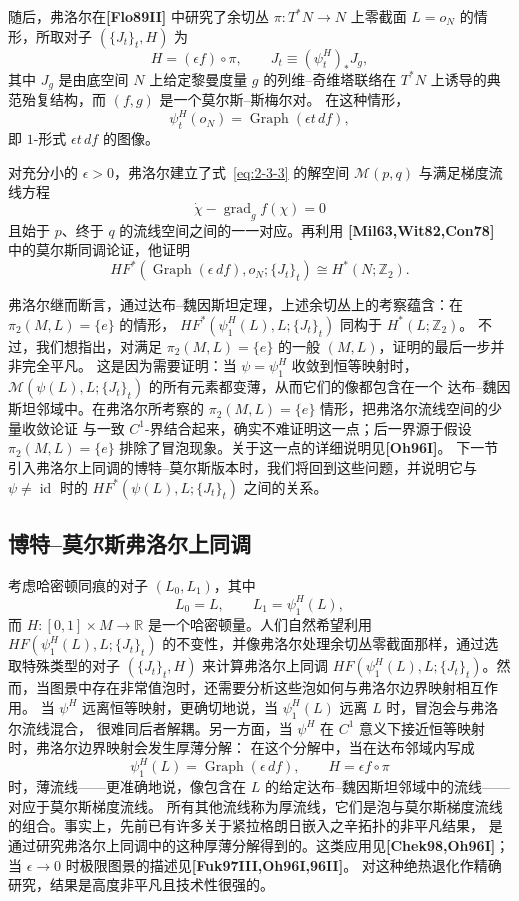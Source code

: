 随后，弗洛尔在\textbf{[Flo89II]} 中研究了余切丛
$\pi:T^*N\to N$ 上零截面 $L=o_N$ 的情形，所取对子
$(\{J_t\}_t,H)$ 为
\[
  H=(\epsilon f)\circ\pi,
  \qquad
  J_t\equiv(\psi_t^H)_*J_g,
\]
其中 $J_g$ 是由底空间 $N$ 上给定黎曼度量 $g$ 的列维--奇维塔联络在
$T^*N$ 上诱导的典范殆复结构，而 $(f,g)$ 是一个莫尔斯--斯梅尔对。
在这种情形，
\[
  \psi_t^H(o_N)=\operatorname{Graph}(\epsilon t\,df),
\]
即 $1$-形式 $\epsilon t\,df$ 的图像。

对充分小的 $\epsilon>0$，弗洛尔建立了式~\eqref{eq:2-3-3} 的解空间
$\mathcal M(p,q)$ 与满足梯度流线方程
\[
  \dot\chi-\operatorname{grad}_g f(\chi)=0
\]
且始于 $p$、终于 $q$ 的流线空间之间的一一对应。再利用
\textbf{[Mil63,Wit82,Con78]} 中的莫尔斯同调论证，他证明
\[
  HF^*(\operatorname{Graph}(\epsilon\,df),o_N;\{J_t\}_t)
  \cong H^*(N;\mathbb Z_2).
\]

弗洛尔继而断言，通过达布--魏因斯坦定理，上述余切丛上的考察蕴含：在
$\pi_2(M,L)=\{e\}$ 的情形，
$HF^*(\psi_1^H(L),L;\{J_t\}_t)$ 同构于 $H^*(L;\mathbb Z_2)$。
不过，我们想指出，对满足 $\pi_2(M,L)=\{e\}$ 的一般 $(M,L)$，证明的最后一步并非完全平凡。
这是因为需要证明：当 $\psi=\psi_1^H$ 收敛到恒等映射时，
$\mathcal M(\psi(L),L;\{J_t\}_t)$ 的所有元素都变薄，从而它们的像都包含在一个
达布--魏因斯坦邻域中。在弗洛尔所考察的 $\pi_2(M,L)=\{e\}$ 情形，把弗洛尔流线空间的少量收敛论证
与一致 $C^1$-界结合起来，确实不难证明这一点；后一界源于假设
$\pi_2(M,L)=\{e\}$ 排除了冒泡现象。关于这一点的详细说明见\textbf{[Oh96I]}。
下一节引入弗洛尔上同调的博特--莫尔斯版本时，我们将回到这些问题，并说明它与
$\psi\neq\operatorname{id}$ 时的 $HF^*(\psi(L),L;\{J_t\}_t)$ 之间的关系。

\subsection{博特--莫尔斯弗洛尔上同调}
\label{sec:2-3-3}

考虑哈密顿同痕的对子 $(L_0,L_1)$，其中
\[
  L_0=L,
  \qquad
  L_1=\psi_1^H(L),
\]
而 $H:[0,1]\times M\to\mathbb R$ 是一个哈密顿量。人们自然希望利用
$HF(\psi_1^H(L),\allowbreak L;\{J_t\}_t)$ 的不变性，并像弗洛尔处理余切丛零截面那样，通过选取特殊类型的对子
$(\{J_t\}_t,H)$ 来计算弗洛尔上同调
$HF(\psi_1^H(L),L;\{J_t\}_t)$。然而，当图景中存在非常值泡时，还需要分析这些泡如何与弗洛尔边界映射相互作用。
当 $\psi^H$ 远离恒等映射，更确切地说，当 $\psi_1^H(L)$ 远离 $L$ 时，冒泡会与弗洛尔流线混合，
很难同后者解耦。另一方面，当 $\psi^H$ 在 $C^1$ 意义下接近恒等映射时，弗洛尔边界映射会发生厚薄分解：
在这个分解中，当在达布邻域内写成
\[
  \psi_1^H(L)=\operatorname{Graph}(\epsilon\,df),
  \qquad
  H=\epsilon f\circ\pi
\]
时，薄流线——更准确地说，像包含在 $L$ 的给定达布--魏因斯坦邻域中的流线——对应于莫尔斯梯度流线。
所有其他流线称为厚流线，它们是泡与莫尔斯梯度流线的组合。事实上，先前已有许多关于紧拉格朗日嵌入之辛拓扑的非平凡结果，
是通过研究弗洛尔上同调中的这种厚薄分解得到的。这类应用见\textbf{[Chek98,Oh96I]}；
当 $\epsilon\to0$ 时极限图景的描述见\textbf{[Fuk97III,Oh96I,96II]}。
对这种绝热退化作精确研究，结果是高度非平凡且技术性很强的。

